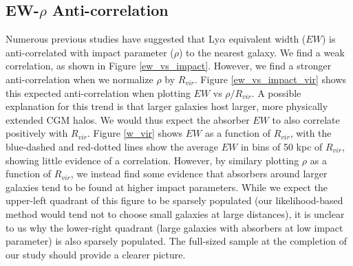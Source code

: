 \documentclass[iop]{emulateapj-rtx4}
\begin{document}
\vspace{10pt}


\subsection{EW-$\rho$ Anti-correlation}
Numerous previous studies have suggested that Ly$\alpha$ equivalent width ($EW$) is anti-correlated with impact parameter ($\rho$) to the nearest galaxy. We find a weak correlation, as shown in Figure \ref{ew_vs_impact}. However, we find a stronger anti-correlation when we normalize $\rho$ by $R_{vir}$. Figure \ref{ew_vs_impact_vir} shows this expected anti-correlation when plotting $EW$ vs $\rho/R_{vir}$. A possible explanation for this trend is that larger galaxies host larger, more physically extended CGM halos. We would thus expect the absorber $EW$ to also correlate positively with $R_{vir}$. Figure \ref{w_vir} shows $EW$ as a function of $R_{vir}$, with the blue-dashed and red-dotted lines show the average $EW$ in bins of 50 kpc of $R_{vir}$, showing little evidence of a correlation. However, by similary plotting $\rho$ as a function of $R_{vir}$, we instead find some evidence that absorbers around larger galaxies tend to be found at higher impact parameters. While we expect the upper-left quadrant of this figure to be sparsely populated (our likelihood-based method would tend not to choose small galaxies at large distances), it is unclear to us why the lower-right quadrant (large galaxies with absorbers at low impact parameter) is also sparsely populated. The full-sized sample at the completion of our study should provide a clearer picture.


\end{document}
